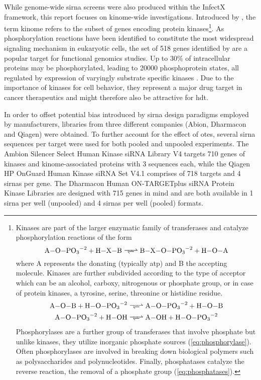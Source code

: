 While genome-wide \gls{sirna} screens were also produced within the InfectX framework, this report focuses on kinome-wide investigations. Introduced by \cite{Manning2002}, the term kinome refers to the subset of genes encoding protein kinases\footnote{Kinases are part of the larger enzymatic family of transferases and catalyze phosphorylation reactions of the form
\begin{equation}
  \ce{A\bond{-}O\bond{-}PO3^{-2} + H\bond{-}X\bond{-}B <=>> B\bond{-}X\bond{-}O\bond{-}PO3^{-2} + H\bond{-}O\bond{-}A} \label{eq:kinase}
\end{equation}
where A represents the donating (typically \gls{atp}) and B the accepting molecule. Kinases are further subdivided according to the type of acceptor which can be an alcohol, carboxy, nitrogenous or phosphate group, or in case of protein kinases, a tyrosine, serine, threonine or histidine residue.
\begin{align}
  \ce{A\bond{-}O\bond{-}B + H\bond{-}O\bond{-}PO3^{-2} &<=>> A\bond{-}O\bond{-}PO3^{-2} + H\bond{-}O\bond{-}B} \label{eq:phosphorylase} \\
  \ce{A\bond{-}O\bond{-}PO3^{-2} + H\bond{-}OH &<=>> A\bond{-}OH + H\bond{-}O\bond{-}PO3^{-2}} \label{eq:phosphatases}
\end{align}
Phosphorylases are a further group of transferases that involve phosphate but unlike kinases, they utilize inorganic phosphate sources (\ref{eq:phosphorylase}). Often phosphorylases are involved in breaking down biological polymers such as polysaccharides and polynucleotides. Finally, phosphatases catalyze the reverse reaction, the removal of a phosphate group (\ref{eq:phosphatases}).}. As phosphorylation reactions have been identified to constitute the most widespread signaling mechanism in eukaryotic cells, the set of 518 genes identified by \citeauthor{Manning2002} are a popular target for functional genomics studies. Up to 30\% of intracellular proteins may be phosphorylated, leading to 20000 phosphoprotein states, all regulated by expression of varyingly substrate specific kinases \citep{Johnson2005}. Due to the importance of kinases for cell behavior, they represent a major drug target in cancer therapeutics and might therefore also be attractive for \gls{hdt}.

In order to offset potential bias introduced by \gls{sirna} design paradigms employed by manufacturers, libraries from three different companies (Abion, Dharmacon and Qiagen) were obtained. To further account for the effect of \glspl{ote}, several \gls{sirna} sequences per target were used for both pooled and unpooled experiments. The Ambion Silencer Select Human Kinase siRNA Library V4 targets 710 genes of kinases and kinome-associated proteins with 3 sequences each, while the Qiagen HP OnGuard Human Kinase siRNA Set V4.1 comprises of 718 targets and 4 \glspl{sirna} per gene. The Dharmacon Human ON-TARGETplus siRNA Protein Kinase Libraries are designed with 715 genes in mind and are both available in 1 \gls{sirna} per well (unpooled) and 4 \glspl{sirna} per well (pooled) formats.

